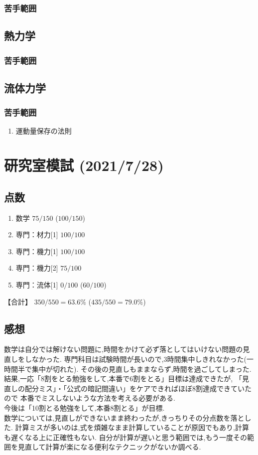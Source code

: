 \documentclass[a4paper]{jsarticle}
\begin{document}
\subsubsection{苦手範囲}
\subsection{熱力学}
\subsubsection{苦手範囲}
\subsection{流体力学}
\subsubsection{苦手範囲}
\begin{enumerate}[(1)]
    \item 運動量保存の法則
\end{enumerate}
\newpage
\section{研究室模試 (2021/7/28)}
\subsection{点数}
\begin{enumerate}[(1)]
    \item 数学 \qquad \qquad $75/150$ ($100/150$)
    \item 専門：材力[1] $100/100$
    \item 専門：機力[1] $100/100$
    \item 専門：機力[2] $75/100$
    \item 専門：流体[1] $0/100$ ($60/100$)
\end{enumerate}
【合計】 $350/550 = 63.6 \%$ \quad ($435/550 = 79.0\%$)
\subsection{感想}
数学は自分では解けない問題に,時間をかけて必ず落としてはいけない問題の見直しをしなかった.
専門科目は試験時間が長いので,3時間集中しきれなかった(一時間半で集中が切れた).
その後の見直しもままならず,時間を過ごしてしまった.\\
結果,一応「8割をとる勉強をして,本番で6割をとる」目標は達成できたが,
「見直しの配分ミス」・「公式の暗記間違い」をケアできればほぼ8割達成できていたので
本番でミスしないような方法を考える必要がある.\\
今後は「10割とる勉強をして,本番8割とる」が目標.\\
数学については,見直しができないまま終わったが,きっちりその分点数を落とした.
計算ミスが多いのは,式を煩雑なまま計算していることが原因でもあり,計算も遅くなる上に正確性もない.
自分が計算が遅いと思う範囲では,もう一度その範囲を見直して計算が楽になる便利なテクニックがないか調べる.
\end{document}
